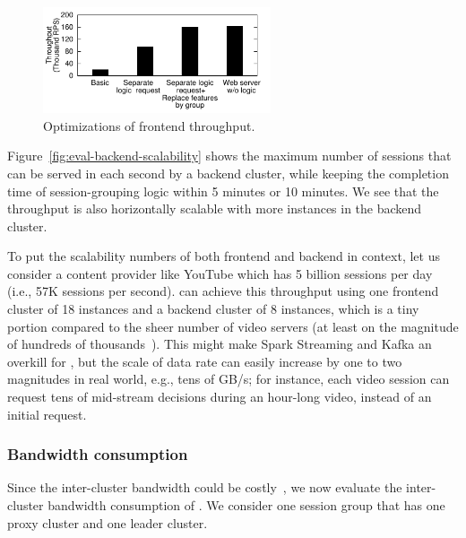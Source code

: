 \begin{figure}[t!]
\centering
\includegraphics[width=0.6\textwidth]{figures/pytheas-Eval-optimization-separatelogic-replacingfeatures-bar.pdf}
\caption{Optimizations of frontend throughput.}
\label{fig:eval-optimization-frontend}
\end{figure}


Figure~\ref{fig:eval-backend-scalability} shows the maximum number of sessions that can be served in each second by a backend cluster, while keeping the completion time of session-grouping logic within 5 minutes or 10 minutes.
We see that the throughput is also horizontally scalable with more instances in the backend cluster. 

To put the scalability numbers of both frontend and backend in context, let us consider a content provider like YouTube which has 5 billion sessions per day~\cite{youtube-stats} (i.e., 57K sessions per second). 
\name can achieve this throughput using one frontend cluster of 18 instances and a backend cluster of 8 instances, which is a tiny portion compared to the sheer number of video servers (at least on the magnitude of hundreds of thousands~\cite{youtube-stats-2}).
This might make Spark Streaming and Kafka an overkill for \name, but the scale of data rate can easily increase by one to two magnitudes in real world, e.g., tens of GB/s; for instance, each video session can request tens of mid-stream decisions during an hour-long video, instead of an initial request.




\subsubsection{Bandwidth consumption}

Since the inter-cluster bandwidth could be costly~\cite{geode,iris}, we now evaluate the inter-cluster bandwidth consumption of \name. %
We consider one session group that has one proxy cluster and one leader cluster.

